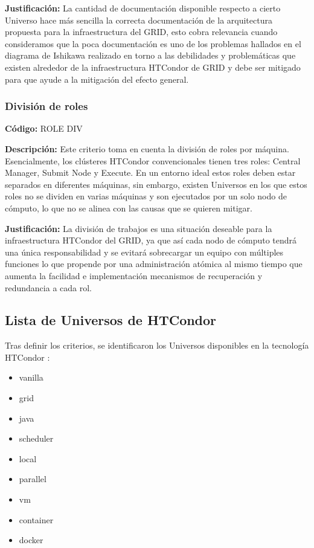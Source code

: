 \textbf{Justificación:} La cantidad de documentación disponible respecto a cierto
Universo hace más sencilla la correcta documentación de la arquitectura
propuesta para la infraestructura del GRID, esto cobra relevancia cuando
consideramos que la poca documentación es uno de los problemas hallados en
el diagrama de Ishikawa realizado en torno a las debilidades y problemáticas que
existen alrededor de la infraestructura HTCondor de GRID y debe ser mitigado
para que ayude a la mitigación del efecto general.

\subsubsection{División de roles}
\textbf{Código:} ROLE DIV

\textbf{Descripción:} Este criterio toma en cuenta la división de roles por máquina.
Esencialmente, los clústeres HTCondor convencionales tienen tres roles: Central
Manager, Submit Node y Execute. En un entorno ideal estos roles deben estar
separados en diferentes máquinas, sin embargo, existen Universos en los que
estos roles no se dividen en varias máquinas y son ejecutados por un solo nodo
de cómputo, lo que no se alinea con las causas que se quieren mitigar.

\textbf{Justificación:} La división de trabajos es una situación deseable para la
infraestructura HTCondor del GRID, ya que así cada nodo de cómputo tendrá una
única responsabilidad y se evitará sobrecargar un equipo con múltiples funciones
lo que propende por una administración atómica al mismo tiempo que aumenta la
facilidad e implementación mecanismos de recuperación y redundancia a cada
rol.



\subsection{Lista de Universos de HTCondor}
Tras definir los criterios, se identificaron los Universos disponibles en la tecnología HTCondor \citep{HTCondor-choosing-universe}:
\begin{itemize}
	\item vanilla
	\item grid
	\item java
	\item scheduler
	\item local
	\item parallel
	\item vm
	\item container
	\item docker
\end{itemize}

